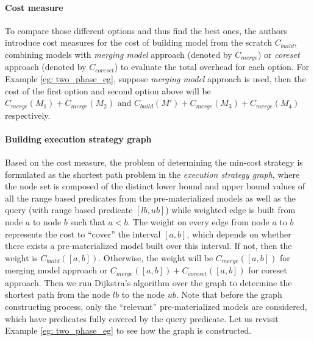 \paragraph{Cost measure} To compare those different options and thus find the best ones, the authors introduce cost measures for the cost of building model from the scratch $C_{build}$, combining models with {\em merging model} approach (denoted by $C_{merge}$) or {\em coreset} approach (denoted by $C_{coreset}$) to evaluate the total overhead for each option. For Example \ref{eg: two_phase_eg}, suppose {\em merging model} approach is used, then the cost of the first option and second option above will be $C_{merge}(M_1) + C_{merge}(M_2)$ and $C_{build}(M') + C_{merge}(M_3) + C_{merge}(M_4)$ respectively. 

\paragraph{Building execution strategy graph} Based on the cost measure, the problem of determining the min-cost strategy is formulated as the shortest path problem in the {\em execution strategy graph}, where the node set is composed of the distinct lower bound and upper bound values of all the range based predicates from the pre-materialized models as well as the query (with range based predicate $[lb, ub]$) while weighted edge is built from node $a$ to node $b$ such that $a < b$. The weight on every edge from node $a$ to $b$ represents the cost to ``cover'' the interval $[a,b]$, which depends on whether there exists a pre-materialized model built over this interval. If not, then the weight is $C_{build}([a,b])$. Otherwise, the weight will be $C_{merge}([a,b])$ for merging model approach or $C_{merge}([a,b]) + C_{coreset}([a,b])$ for coreset approach. Then we run Dijkstra's algorithm over the graph to determine the shortest path from the node $lb$ to the node $ub$. Note that before the graph constructing process, only the ``relevant'' pre-materialized models are considered, which have predicates fully covered by the query predicate. Let us revisit Example \ref{eg: two_phase_eg} to see how the graph is constructed.

